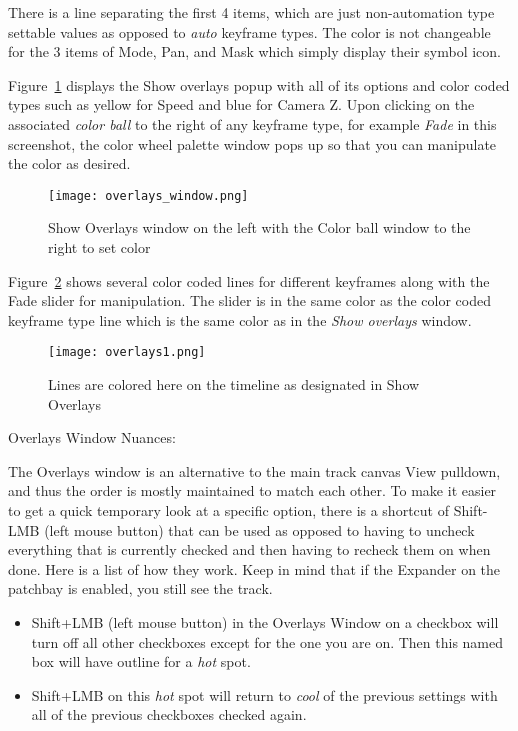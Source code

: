 There is a line separating the first 4 items, which are just non-automation type settable values as opposed to \textit{auto} keyframe types.  
The color is not changeable for the 3 items of Mode, Pan, and Mask which simply display their symbol icon.

Figure~\ref{fig:overlays_window} displays the Show overlays popup with all of its options and color coded types such as yellow for Speed and blue for Camera Z.  
Upon clicking on the associated \textit{color ball} to the right of any keyframe type, for example \textit{Fade} in this screenshot, the color wheel palette window pops up so that you can manipulate the color as desired.

\begin{figure}[htpb]
    \centering
    \texttt{[image: overlays\_window.png]}
    \caption{Show Overlays window on the left with the Color ball window to the right to set color}
    \label{fig:overlays_window}
\end{figure}

Figure~\ref{fig:overlays1} shows several color coded lines for different keyframes along with the Fade slider for manipulation.  
The slider is in the same color as the color coded keyframe type line which is the same color as in the \textit{Show overlays} window.

\begin{figure}[htpb]
    \centering
    \texttt{[image: overlays1.png]}
    \caption{Lines are colored here on the timeline as designated in Show Overlays}
    \label{fig:overlays1}
\end{figure}

Overlays Window Nuances:

The Overlays window is an alternative to the main track canvas View pulldown, and thus the order is mostly maintained to match each other.  
To make it easier to get a quick temporary look at a specific option, there is a shortcut of Shift-LMB (left mouse button) that can be used as opposed to having to uncheck everything that is currently checked and then having to recheck them on when done.  
Here is a list of how they work.  Keep in mind that if the Expander on the patchbay is enabled, you still see the track.

\begin{itemize}
    \item  Shift+LMB (left mouse button) in the Overlays Window on a checkbox will turn off all other
        checkboxes except for the one you are on.  Then this named box will have outline for a  \textit{hot} spot.
    \item  Shift+LMB on this \textit{hot} spot will return to \textit{cool} of the previous settings with all of the previous
        checkboxes checked again.
\end{itemize}

